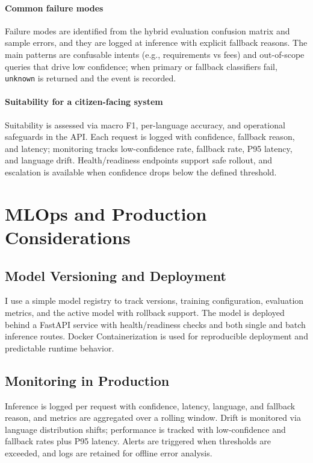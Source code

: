 \documentclass[11pt]{article}
\begin{document}
\paragraph{Common failure modes}
Failure modes are identified from the hybrid evaluation confusion matrix and sample errors, and they are logged at inference with explicit fallback reasons. The main patterns are confusable intents (e.g., requirements vs fees) and out-of-scope queries that drive low confidence; when primary or fallback classifiers fail, \texttt{unknown} is returned and the event is recorded.

\paragraph{Suitability for a citizen-facing system}
Suitability is assessed via macro F1, per-language accuracy, and operational safeguards in the API. Each request is logged with confidence, fallback reason, and latency; monitoring tracks low-confidence rate, fallback rate, P95 latency, and language drift. Health/readiness endpoints support safe rollout, and escalation is available when confidence drops below the defined threshold.

\section*{MLOps and Production Considerations}

\subsection*{Model Versioning and Deployment}

I use a simple model registry to track versions, training configuration, evaluation metrics, and the active model with rollback support. The model is deployed behind a FastAPI service with health/readiness checks and both single and batch inference routes. Docker Containerization is used for reproducible deployment and predictable runtime behavior.

\subsection*{Monitoring in Production}

Inference is logged per request with confidence, latency, language, and fallback reason, and metrics are aggregated over a rolling window. Drift is monitored via language distribution shifts; performance is tracked with low-confidence and fallback rates plus P95 latency. Alerts are triggered when thresholds are exceeded, and logs are retained for offline error analysis.
\end{document}
